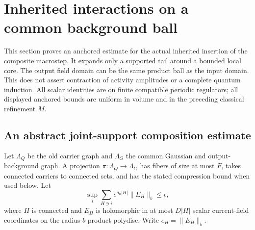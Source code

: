\documentclass[11pt]{article}
\theoremstyle{remark}
\begin{document}
\section{Inherited interactions on a common background ball}
\label{cdj-section}

This section proves an anchored estimate for the actual inherited
insertion of the composite macrostep. It expands only a supported
tail around a bounded local core. The output field domain can be
the same product ball as the input domain. This does not assert
contraction of activity amplitudes or a complete quantum induction.
All scalar identities are on finite compatible periodic regulators;
all displayed anchored bounds are uniform in volume and in the
preceding classical refinement $M$.

\subsection{An abstract joint-support composition estimate}
\label{cdj-abstract-section}

Let $\Lambda_Q$ be the old carrier graph and $\Lambda_G$ the
common Gaussian and output-background graph. A projection
$\pi:\Lambda_Q\to\Lambda_G$ has fibers of size at most $F$,
takes connected carriers to connected sets, and has the stated
compression bound when used below. Let
\begin{equation}\label{cdj-input}
 \sup_i\sum_{H\ni i}e^{a_0|H|}\|E_H\|_b\le\epsilon,
\end{equation}
where $H$ is connected and $E_H$ is holomorphic in at most
$D|H|$ scalar current-field coordinates on the radius-$b$
product polydisc. Write $e_H=\|E_H\|_b$.
\end{document}

